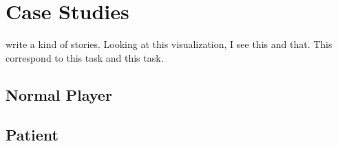 \chapter{Case Studies}
write a kind of stories. Looking at this visualization, I see this and that. This correspond to this task and this task.
\section{Normal Player}
\section{Patient}